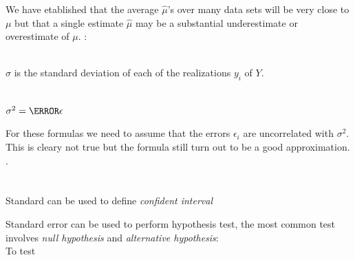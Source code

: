 We have etablished that the average $\widehat{\mu}$'s over many data
sets will be very close to $\mu$ but that a single estimate $\widehat{
\mu}$ may be a substantial underestimate or overestimate of $\mu$.
:\begin{center}\\$\sigma$ is the standard deviation of each of the realizations 
$y_{i}$ of $Y$.\end{center}
\begin{center}\\$\sigma^{2}=\V{\epsilon}$\end{center}For these
formulas we need to assume that the errors $\epsilon_{i}$ are
uncorrelated with $\sigma^{2}$. This is cleary not true but the formula
still turn out to be a good approximation.\\  .\\\\\\
Standard can be used to define \emph{confident interval}
 \begin{center}
\end{center}Standard error can be used
to perform hypothesis test, the most common test involves \emph{null
hypothesis} and \emph{alternative hypothesis}:\\To test
